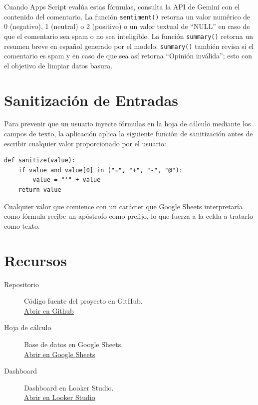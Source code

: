 \documentclass[12pt,a4paper]{article}
\begin{document}
Cuando Apps Script evalúa estas fórmulas, consulta la API de Gemini con el contenido del comentario. La función \texttt{sentiment()} retorna un valor numérico de 0 (negativo), 1 (neutral) o 2 (positivo) o un valor textual de ``NULL'' en caso de que el comentario sea spam o no sea inteligible. La función \texttt{summary()} retorna un resumen breve en español generado por el modelo. \texttt{summary()} también revisa si el comentario es spam y en caso de que sea así retorna ``Opinión inválida''; esto con el objetivo de limpiar datos basura.

\section{Sanitización de Entradas}

Para prevenir que un usuario inyecte fórmulas en la hoja de cálculo mediante los campos de texto, la aplicación aplica la siguiente función de sanitización antes de escribir cualquier valor proporcionado por el usuario:

\begin{verbatim}
def sanitize(value):
    if value and value[0] in ("=", "+", "-", "@"):
        value = "'" + value
    return value
\end{verbatim}

Cualquier valor que comience con un carácter que Google Sheets interpretaría como fórmula recibe un apóstrofo como prefijo, lo que fuerza a la celda a tratarlo como texto.

\section{Recursos}

\begin{description}
  \item[Repositorio] Código fuente del proyecto en GitHub. \\
    \href{https://github.com/AramJSana/alegra-feedback}{Abrir en Github}

  \item[Hoja de cálculo] Base de datos en Google Sheets. \\
    \href{https://docs.google.com/spreadsheets/d/1llU1xHQS3loVhMLypi-ub3gym31dBz132xzm9ZSESmw/edit?usp=sharing}{Abrir en Google Sheets}

  \item[Dashboard] Dashboard en Looker Studio. \\
    \href{https://lookerstudio.google.com/reporting/aa34c5ba-0c2a-41a2-957d-bf4df6ef1a73}{Abrir en Looker Studio}
\end{description}
\end{document}

